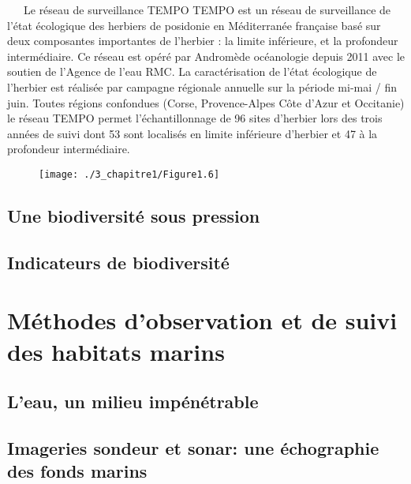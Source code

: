 \begin{encadre}
 \label{garigue_monde}
\begin{bclogo}[couleur=encadre, couleurBord=encadre, couleurTexte=black, arrondi=0.1, marge=16,
logo=\monimage, nobreak=true]{~~~Le réseau de surveillance TEMPO}
 \vspace{5pt}
TEMPO est un réseau de surveillance de l’état écologique des herbiers de posidonie en Méditerranée française basé sur deux composantes importantes de l’herbier : la limite inférieure, et la profondeur intermédiaire. Ce réseau est opéré par Andromède océanologie depuis 2011 avec le soutien de l’Agence de l’eau RMC. La caractérisation de l’état écologique de l’herbier est réalisée par campagne régionale annuelle sur la période mi-mai / fin juin. Toutes régions confondues (Corse, Provence-Alpes Côte d’Azur et Occitanie) le réseau TEMPO permet l’échantillonnage de 96 sites d’herbier lors des trois années de suivi dont 53 sont localisés en limite inférieure d’herbier et 47 à la profondeur intermédiaire.
 
 \begin{figure}[H]
	\begin{center}
	\texttt{[image: ./3\_chapitre1/Figure1.6]}
    \end{center}
\end{figure}
 
 
\end{bclogo}
\end{encadre}

\subsection{Une biodiversité sous pression}\label{intro.1.2}
\subsection{Indicateurs de biodiversité}\label{intro.1.3}

\newpage

\section{Méthodes d'observation et de suivi des habitats marins}\label{intro.2}
\subsection{L'eau, un milieu impénétrable}\label{intro.2.1}
\subsection{Imageries sondeur et sonar: une échographie des fonds marins}\label{intro.2.2}
